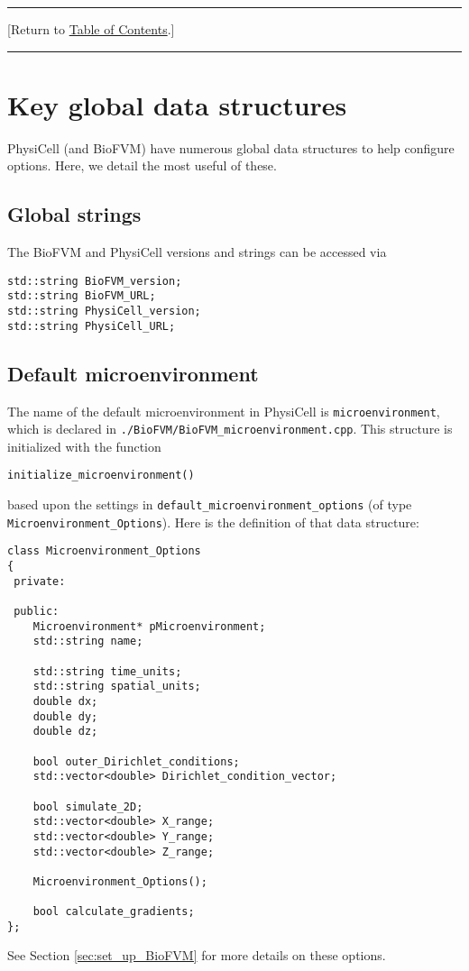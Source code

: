 \documentclass[12pt]{article}
\renewcommand{\v}{\verb}
\newcommand{\blue}[1]{\textcolor{blue}{#1}}
\newcommand{\DONE}{}%
\newcommand{\TOClink}{\begin{center}\hrule\vskip-5pt\phantom{.}\hfill[Return to \hyperlink{TOC}{Table of Contents}.]\hfill\phantom{.}\vskip3pt\hrule\end{center}}
\begin{document}
\TOClink 

\section{Key global data structures \DONE}
\label{sec:key_global_data}
PhysiCell (and BioFVM) have numerous global data structures 
to help configure options. Here, we detail the most useful 
of these. 

\subsection{Global strings}
\label{sec:global_strings}
The BioFVM and PhysiCell versions and strings can be accessed via 
\begin{verbatim}
std::string BioFVM_version; 
std::string BioFVM_URL;  
std::string PhysiCell_version; 
std::string PhysiCell_URL; 
\end{verbatim}

\subsection{Default microenvironment \DONE}
\label{sec:default_microenvironment}
The name of the default microenvironment in PhysiCell is 
\v|microenvironment|, which is declared in 
\v|./BioFVM/BioFVM_microenvironment.cpp|. This structure is initialized 
with the function 

\v|initialize_microenvironment()|

based upon the settings in \v|default_microenvironment_options| (of type \v|Microenvironment_Options|). 
Here is the definition of that data structure: 

\begin{verbatim}
class Microenvironment_Options
{
 private:
 
 public: 
    Microenvironment* pMicroenvironment;
    std::string name; 
 
    std::string time_units; 
    std::string spatial_units; 
    double dx;
    double dy; 
    double dz; 
    
    bool outer_Dirichlet_conditions; 
    std::vector<double> Dirichlet_condition_vector; 
    
    bool simulate_2D; 
    std::vector<double> X_range; 
    std::vector<double> Y_range; 
    std::vector<double> Z_range; 
    
    Microenvironment_Options(); 
    
    bool calculate_gradients; 
};
\end{verbatim}
See Section \ref{sec:set_up_BioFVM} for more details on these options. 
\end{document}
